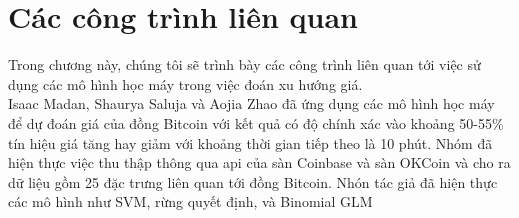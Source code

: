 \chapter{Các công trình liên quan} \label{chap-Related_work}
Trong chương này, chúng tôi sẽ trình bày các công trình liên quan tới việc sử dụng các mô hình học máy trong việc đoán xu hướng giá.\\
Isaac Madan, Shaurya Saluja và Aojia Zhao đã ứng dụng các mô hình học máy để dự đoán giá của đồng Bitcoin với kết quả có độ chính xác vào khoảng 50-55\% tín hiệu giá tăng hay giảm với khoảng thời gian tiếp theo là 10 phút. Nhóm đã hiện thực việc thu thập thông qua api của sàn Coinbase và sàn OKCoin và cho ra dữ liệu gồm 25 đặc trưng liên quan tới đồng Bitcoin. Nhón tác giả đã hiện thực các mô hình như SVM, rừng quyết định, và Binomial GLM